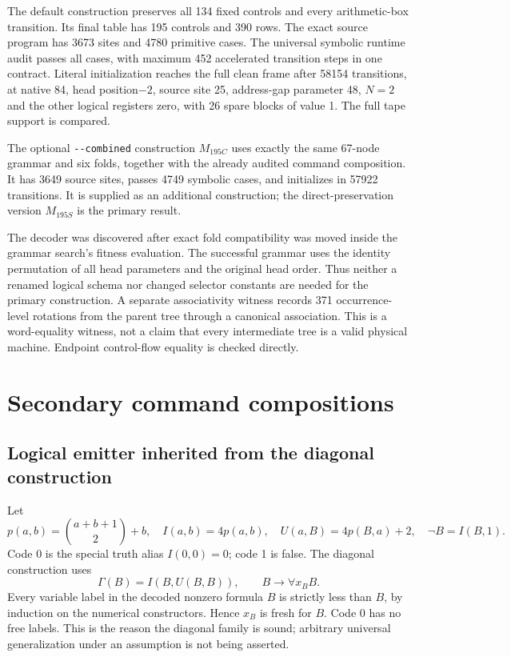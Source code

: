 \documentclass[11pt,a4paper]{article}
\newcommand{\file}[1]{\texttt{\nolinkurl{#1}}}
\begin{document}
The default construction preserves all 134 fixed controls and every
arithmetic-box transition. Its final table has 195 controls and 390 rows.
The exact source program has 3673 sites and 4780 primitive cases.
The universal symbolic runtime audit passes all cases, with maximum 452
accelerated transition steps in one contract. Literal initialization
reaches the full clean frame after 58154 transitions, at native 84,
head position$-2$, source site 25, address-gap parameter 48,
$N=2$ and the other logical registers zero, with 26 spare blocks of
value 1. The full tape support is compared.

The optional \file{--combined} construction $M_{195C}$ uses exactly
the same 67-node grammar and six folds, together with the already
audited command composition. It has 3649 source sites, passes 4749
symbolic cases, and initializes in 57922 transitions. It is supplied
as an additional construction; the direct-preservation version
$M_{195S}$ is the primary result.

The decoder was discovered after exact fold compatibility was moved
inside the grammar search's fitness evaluation. The successful grammar
uses the identity permutation of all head parameters and the original
head order. Thus neither a renamed logical schema nor changed selector
constants are needed for the primary construction. A separate
associativity witness records 371 occurrence-level rotations from the
parent tree through a canonical association. This is a word-equality
witness, not a claim that every intermediate tree is a valid physical
machine. Endpoint control-flow equality is checked directly.





\section{Secondary command compositions}
\label{sec:compositions}

\subsection{Logical emitter inherited from the diagonal construction}

Let
\[
 p(a,b)=\binom{a+b+1}{2}+b,\quad
 I(a,b)=4p(a,b),\quad U(a,B)=4p(B,a)+2,
 \quad \neg B=I(B,1).
\]
Code 0 is the special truth alias $I(0,0)=0$; code 1 is false.
The diagonal construction uses
\[
 \Gamma(B)=I(B,U(B,B)),
 \qquad B\longrightarrow\forall x_B B.
\]
Every variable label in the decoded nonzero formula $B$ is strictly
less than $B$, by induction on the numerical constructors. Hence
$x_B$ is fresh for $B$. Code 0 has no free labels. This is the
reason the diagonal family is sound; arbitrary universal
generalization under an assumption is not being asserted.
\end{document}

